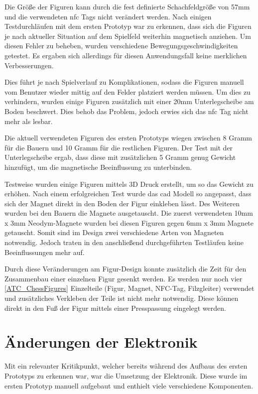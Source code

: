 Die Größe der Figuren kann durch die fest definierte Schachfeldgröße von
57mm und die verwendeten \gls{nfc} Tags nicht verändert werden. Nach
einigen Testdurchläufen mit dem ersten Prototyp war zu erkennen, dass
sich die Figuren je nach aktueller Situation auf dem Spielfeld weiterhin
magnetisch anziehen. Um diesen Fehler zu beheben, wurden verschiedene
Bewegungsgeschwindigkeiten getestet. Es ergaben sich allerdings für
diesen Anwendungsfall keine merklichen Verbesserungen.

Dies führt je nach Spielverlauf zu Komplikationen, sodass die Figuren
manuell vom Benutzer wieder mittig auf den Felder platziert werden
müssen. Um dies zu verhindern, wurden einige Figuren zusätzlich mit
einer 20mm Unterlegscheibe am Boden beschwert. Dies behob das Problem,
jedoch erwies sich das \gls{nfc} Tag nicht mehr als lesbar.

Die aktuell verwendeten Figuren des ersten Prototyps wiegen zwischen 8
Gramm für die Bauern und 10 Gramm für die restlichen Figuren. Der Test
mit der Unterlegscheibe ergab, dass diese mit zusätzlichen 5 Gramm genug
Gewicht hinzufügt, um die magnetische Beeinflussung zu unterbinden.

Testweise wurden einige Figuren mittels 3D Druck erstellt, um so das
Gewicht zu erhöhen. Nach einem erfolgreichen Test wurde das \gls{cad}
Modell so angepasst, dass sich der Magnet direkt in den Boden der Figur
einkleben lässt. Des Weiteren wurden bei den Bauern die Magnete
ausgetauscht. Die zuerst verwendeten 10mm x 3mm Neodym-Magnete wurden
bei diesen Figuren gegen 6mm x 3mm Magnete getauscht. Somit sind im
Design zwei verschiedene Arten von Magneten notwendig. Jedoch traten in
den anschließend durchgeführten Testläufen keine Beeinflussungen mehr
auf.

Durch diese Veränderungen am Figur-Design konnte zusätzlich die Zeit für
den Zusammenbau einer einzelnen Figur gesenkt werden. Es werden nur noch
vier \ref{ATC_ChessFigures} Einzelteile (Figur, Magnet, NFC-Tag,
Filzgleiter) verwendet und zusätzliches Verkleben der Teile ist nicht
mehr notwendig. Diese können direkt in den Fuß der Figur mittels einer
Presspassung eingelegt werden.

\hypertarget{uxe4nderungen-der-elektronik}{%
\section{Änderungen der Elektronik}\label{uxe4nderungen-der-elektronik}}

Mit ein relevanter Kritikpunkt, welcher bereits während des Aufbaus des
ersten Prototyps zu erkennen war, war die Umsetzung der Elektronik.
Diese wurde im ersten Prototyp manuell aufgebaut und enthielt viele
verschiedene Komponenten.

